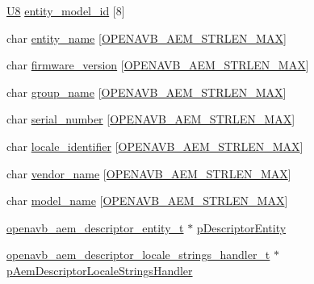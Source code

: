 \begin{DoxyCompactItemize}
\item 
\hyperlink{openavb__types__base__pub_8h_aa63ef7b996d5487ce35a5a66601f3e73}{U8} \hyperlink{structopenavb__avdecc__cfg__t_a10141ef89fe144c95be49eeb9a34b2d1}{entity\+\_\+model\+\_\+id} \mbox{[}8\mbox{]}
\item 
char \hyperlink{structopenavb__avdecc__cfg__t_a287f7f53f991f5fea7fd405411dcfdc3}{entity\+\_\+name} \mbox{[}\hyperlink{openavb__aem__types__pub_8h_ab2bb82e9f856a76b8305e4864f23ee58}{O\+P\+E\+N\+A\+V\+B\+\_\+\+A\+E\+M\+\_\+\+S\+T\+R\+L\+E\+N\+\_\+\+M\+AX}\mbox{]}
\item 
char \hyperlink{structopenavb__avdecc__cfg__t_a473ae1645816e0b43a62c429ffa1c92d}{firmware\+\_\+version} \mbox{[}\hyperlink{openavb__aem__types__pub_8h_ab2bb82e9f856a76b8305e4864f23ee58}{O\+P\+E\+N\+A\+V\+B\+\_\+\+A\+E\+M\+\_\+\+S\+T\+R\+L\+E\+N\+\_\+\+M\+AX}\mbox{]}
\item 
char \hyperlink{structopenavb__avdecc__cfg__t_a4089e7b5575e5dda250db1b7c4343dd5}{group\+\_\+name} \mbox{[}\hyperlink{openavb__aem__types__pub_8h_ab2bb82e9f856a76b8305e4864f23ee58}{O\+P\+E\+N\+A\+V\+B\+\_\+\+A\+E\+M\+\_\+\+S\+T\+R\+L\+E\+N\+\_\+\+M\+AX}\mbox{]}
\item 
char \hyperlink{structopenavb__avdecc__cfg__t_a93332d47b2b17f082c032a02a1f656c3}{serial\+\_\+number} \mbox{[}\hyperlink{openavb__aem__types__pub_8h_ab2bb82e9f856a76b8305e4864f23ee58}{O\+P\+E\+N\+A\+V\+B\+\_\+\+A\+E\+M\+\_\+\+S\+T\+R\+L\+E\+N\+\_\+\+M\+AX}\mbox{]}
\item 
char \hyperlink{structopenavb__avdecc__cfg__t_afda212eab2b55f1e8ee2374dc1b24969}{locale\+\_\+identifier} \mbox{[}\hyperlink{openavb__aem__types__pub_8h_ab2bb82e9f856a76b8305e4864f23ee58}{O\+P\+E\+N\+A\+V\+B\+\_\+\+A\+E\+M\+\_\+\+S\+T\+R\+L\+E\+N\+\_\+\+M\+AX}\mbox{]}
\item 
char \hyperlink{structopenavb__avdecc__cfg__t_a5fa2d0fc97f2492fae6c3d175cc4b0db}{vendor\+\_\+name} \mbox{[}\hyperlink{openavb__aem__types__pub_8h_ab2bb82e9f856a76b8305e4864f23ee58}{O\+P\+E\+N\+A\+V\+B\+\_\+\+A\+E\+M\+\_\+\+S\+T\+R\+L\+E\+N\+\_\+\+M\+AX}\mbox{]}
\item 
char \hyperlink{structopenavb__avdecc__cfg__t_a3f4000cdee37498566d9b91ef52ea2a1}{model\+\_\+name} \mbox{[}\hyperlink{openavb__aem__types__pub_8h_ab2bb82e9f856a76b8305e4864f23ee58}{O\+P\+E\+N\+A\+V\+B\+\_\+\+A\+E\+M\+\_\+\+S\+T\+R\+L\+E\+N\+\_\+\+M\+AX}\mbox{]}
\item 
\hyperlink{structopenavb__aem__descriptor__entity__t}{openavb\+\_\+aem\+\_\+descriptor\+\_\+entity\+\_\+t} $\ast$ \hyperlink{structopenavb__avdecc__cfg__t_a268a49d820d3f18d5c6476073fc6c521}{p\+Descriptor\+Entity}
\item 
\hyperlink{structopenavb__aem__descriptor__locale__strings__handler__t}{openavb\+\_\+aem\+\_\+descriptor\+\_\+locale\+\_\+strings\+\_\+handler\+\_\+t} $\ast$ \hyperlink{structopenavb__avdecc__cfg__t_a134fab2ffaf44252b316eca7d2706fd9}{p\+Aem\+Descriptor\+Locale\+Strings\+Handler}
\end{DoxyCompactItemize}


